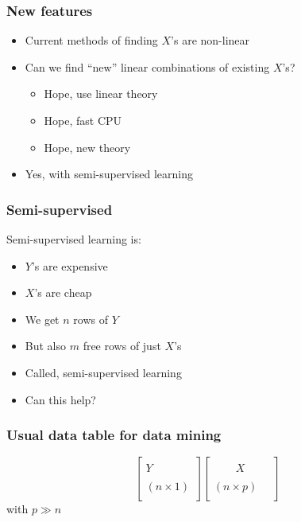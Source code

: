 \documentclass{beamer}
\begin{document}
\begin{frame}
\frametitle{New features}


\begin{itemize}
\item Current methods of finding $X$'s are non-linear
\item Can we find ``new'' linear combinations of existing
$X$'s?
\begin{itemize}
\item Hope, use linear theory
\item Hope, fast CPU
\item Hope, new theory
\end{itemize}
\end{itemize}
\pause
\begin{itemize}
\item Yes, with semi-supervised learning
\end{itemize}
\end{frame}







\begin{frame}
\frametitle{Semi-supervised}
Semi-supervised learning is:
\begin{itemize}
\item $Y$'s are expensive 
\item $X$'s are cheap
\item We get $n$ rows of $Y$
\item But also $m$ free rows of just $X$'s
\item Called, semi-supervised learning
\item Can this help?
\end{itemize}
\end{frame}


\begin{frame}
 \frametitle{Usual data table for data mining}
\begin{displaymath}
\left[\begin{array}{c}
         \quad \\
          Y \\
          \quad \\
          (n \times 1) \\
          \quad 
\end{array}
\right] 
\left[\begin{array}{c}
         \quad \\
          \quad\quad X \quad\quad \\
          \quad \\
          (n \times p) \\
          \quad 
\end{array}
\right] 
\end{displaymath}
with $p \gg n$
\end{frame}
\end{document}
